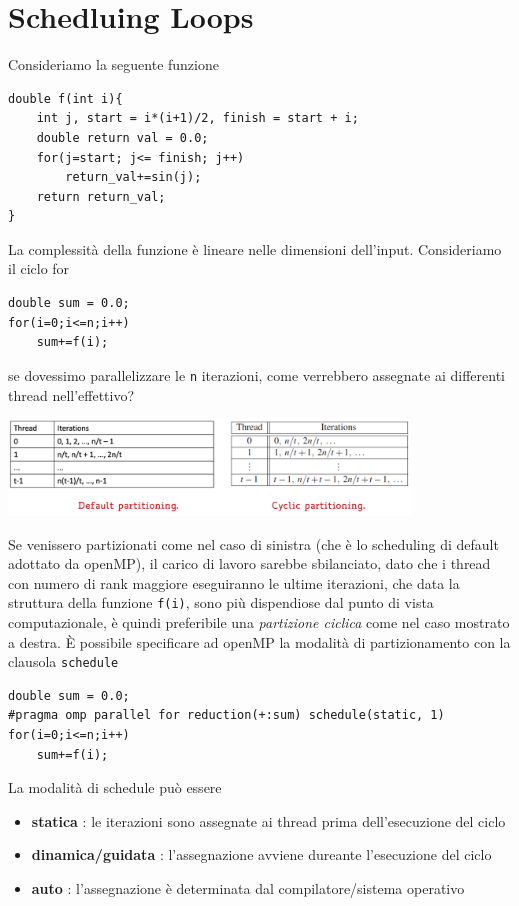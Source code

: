 \documentclass[10pt, letterpaper]{report}
\begin{document}
\section{Schedluing Loops}
Consideriamo la seguente funzione 
\begin{lstlisting}[style=CStyle]
double f(int i){
    int j, start = i*(i+1)/2, finish = start + i;
    double return val = 0.0;
    for(j=start; j<= finish; j++)
        return_val+=sin(j);
    return return_val;
}
\end{lstlisting}
La complessità della funzione è lineare nelle dimensioni dell'input. Consideriamo il ciclo for 
\begin{lstlisting}[style=CStyle]
double sum = 0.0;
for(i=0;i<=n;i++)
    sum+=f(i);
\end{lstlisting}
se dovessimo parallelizzare le \texttt{n} iterazioni, come verrebbero assegnate ai differenti thread nell'effettivo?
\begin{center}
    \includegraphics[width=0.8\textwidth ]{images/schedulingLoops.png}
\end{center}
Se venissero partizionati come nel caso di sinistra (che è lo scheduling di default adottato da openMP), il carico di lavoro sarebbe sbilanciato, dato che i thread con numero di rank maggiore eseguiranno le ultime iterazioni, che data la struttura della funzione \texttt{f(i)}, sono più dispendiose dal punto di vista computazionale, è quindi preferibile una \textit{partizione ciclica} come nel caso mostrato a destra. È possibile specificare ad openMP la modalità di partizionamento con la clausola \texttt{schedule}
\begin{lstlisting}[style=CStyle]
double sum = 0.0;
#pragma omp parallel for reduction(+:sum) schedule(static, 1)
for(i=0;i<=n;i++)
    sum+=f(i);
\end{lstlisting}
La modalità di schedule può essere\begin{itemize}
    \item \textbf{statica} : le iterazioni sono assegnate ai thread prima dell'esecuzione del ciclo 
    \item \textbf{dinamica/guidata} : l'assegnazione avviene dureante l'esecuzione del ciclo 
    \item \textbf{auto} : l'assegnazione è determinata dal compilatore/sistema operativo 
\end{itemize}
\end{document}
